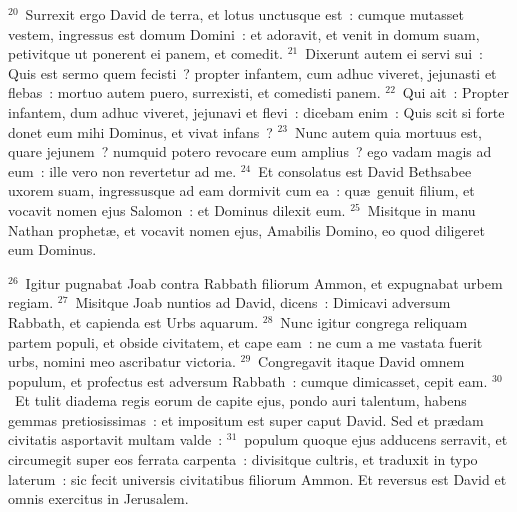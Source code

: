 ${}^{20}$~Surrexit ergo David de terra, et lotus unctusque est~: cumque mutasset vestem, ingressus est domum Domini~: et adoravit, et venit in domum suam, petivitque ut ponerent ei panem, et comedit.
${}^{21}$~Dixerunt autem ei servi sui~: Quis est sermo quem fecisti~? propter infantem, cum adhuc viveret, jejunasti et flebas~: mortuo autem puero, surrexisti, et comedisti panem.
${}^{22}$~Qui ait~: Propter infantem, dum adhuc viveret, jejunavi et flevi~: dicebam enim~: Quis scit si forte donet eum mihi Dominus, et vivat infans~?
${}^{23}$~Nunc autem quia mortuus est, quare jejunem~? numquid potero revocare eum amplius~? ego vadam magis ad eum~: ille vero non revertetur ad me.
${}^{24}$~Et consolatus est David Bethsabee uxorem suam, ingressusque ad eam dormivit cum ea~: qu\ae\ genuit filium, et vocavit nomen ejus Salomon~: et Dominus dilexit eum.
${}^{25}$~Misitque in manu Nathan prophet\ae , et vocavit nomen ejus, Amabilis Domino, eo quod diligeret eum Dominus.


${}^{26}$~Igitur pugnabat Joab contra Rabbath filiorum Ammon, et expugnabat urbem regiam.
${}^{27}$~Misitque Joab nuntios ad David, dicens~: Dimicavi adversum Rabbath, et capienda est Urbs aquarum.
${}^{28}$~Nunc igitur congrega reliquam partem populi, et obside civitatem, et cape eam~: ne cum a me vastata fuerit urbs, nomini meo ascribatur victoria.
${}^{29}$~Congregavit itaque David omnem populum, et profectus est adversum Rabbath~: cumque dimicasset, cepit eam.
${}^{30}$~Et tulit diadema regis eorum de capite ejus, pondo auri talentum, habens gemmas pretiosissimas~: et impositum est super caput David. Sed et pr\ae dam civitatis asportavit multam valde~:
${}^{31}$~populum quoque ejus adducens serravit, et circumegit super eos ferrata carpenta~: divisitque cultris, et traduxit in typo laterum~: sic fecit universis civitatibus filiorum Ammon. Et reversus est David et omnis exercitus in Jerusalem.


